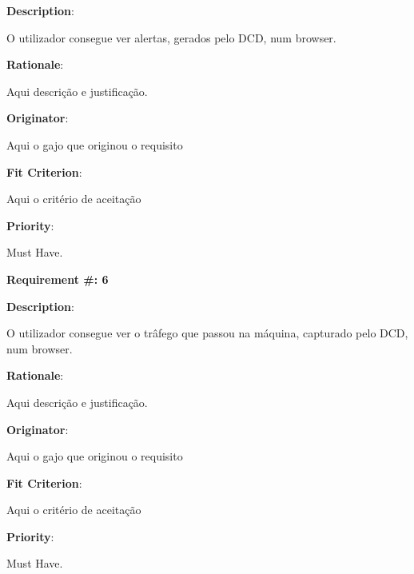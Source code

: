 \begin{description}
\item \textbf{Description}:

O utilizador consegue ver alertas, gerados pelo DCD, num browser.

\item \textbf{Rationale}:

Aqui descrição e justificação. \\
\item \textbf{Originator}:

Aqui o gajo que originou o requisito\\

\item \textbf{Fit Criterion}:

Aqui o critério de aceitação \\

\item \textbf{Priority}:

Must Have. \\

\end{description}

\pagebreak





\begin{minipage}{0.55\textwidth}
\begin{flushleft}\textbf{Requirement \#: 6}\end{flushleft}
\end{minipage}
\begin{minipage}{0.4\textwidth}
\end{minipage}

\begin{description}
\item \textbf{Description}:

O utilizador consegue ver o trâfego que passou na máquina, capturado pelo DCD, num browser.

\item \textbf{Rationale}:

Aqui descrição e justificação. \\
\item \textbf{Originator}:

Aqui o gajo que originou o requisito\\

\item \textbf{Fit Criterion}:

Aqui o critério de aceitação \\

\item \textbf{Priority}:

Must Have. \\

\end{description}

